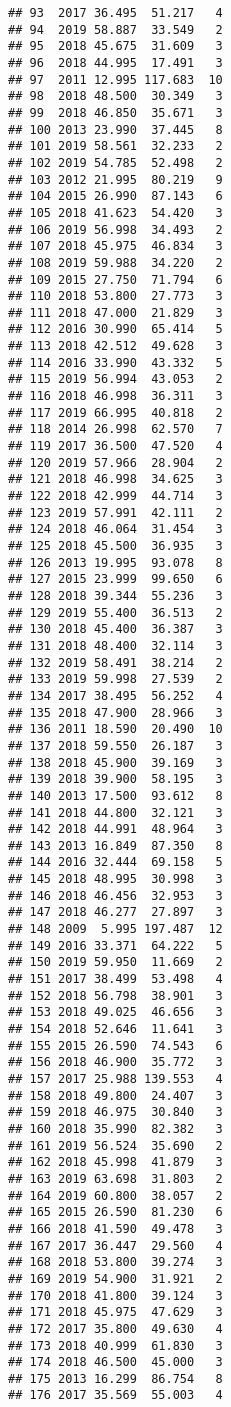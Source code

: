 \documentclass[
]{article}
\begin{document}
\begin{verbatim}
## 93  2017 36.495  51.217   4
## 94  2019 58.887  33.549   2
## 95  2018 45.675  31.609   3
## 96  2018 44.995  17.491   3
## 97  2011 12.995 117.683  10
## 98  2018 48.500  30.349   3
## 99  2018 46.850  35.671   3
## 100 2013 23.990  37.445   8
## 101 2019 58.561  32.233   2
## 102 2019 54.785  52.498   2
## 103 2012 21.995  80.219   9
## 104 2015 26.990  87.143   6
## 105 2018 41.623  54.420   3
## 106 2019 56.998  34.493   2
## 107 2018 45.975  46.834   3
## 108 2019 59.988  34.220   2
## 109 2015 27.750  71.794   6
## 110 2018 53.800  27.773   3
## 111 2018 47.000  21.829   3
## 112 2016 30.990  65.414   5
## 113 2018 42.512  49.628   3
## 114 2016 33.990  43.332   5
## 115 2019 56.994  43.053   2
## 116 2018 46.998  36.311   3
## 117 2019 66.995  40.818   2
## 118 2014 26.998  62.570   7
## 119 2017 36.500  47.520   4
## 120 2019 57.966  28.904   2
## 121 2018 46.998  34.625   3
## 122 2018 42.999  44.714   3
## 123 2019 57.991  42.111   2
## 124 2018 46.064  31.454   3
## 125 2018 45.500  36.935   3
## 126 2013 19.995  93.078   8
## 127 2015 23.999  99.650   6
## 128 2018 39.344  55.236   3
## 129 2019 55.400  36.513   2
## 130 2018 45.400  36.387   3
## 131 2018 48.400  32.114   3
## 132 2019 58.491  38.214   2
## 133 2019 59.998  27.539   2
## 134 2017 38.495  56.252   4
## 135 2018 47.900  28.966   3
## 136 2011 18.590  20.490  10
## 137 2018 59.550  26.187   3
## 138 2018 45.900  39.169   3
## 139 2018 39.900  58.195   3
## 140 2013 17.500  93.612   8
## 141 2018 44.800  32.121   3
## 142 2018 44.991  48.964   3
## 143 2013 16.849  87.350   8
## 144 2016 32.444  69.158   5
## 145 2018 48.995  30.998   3
## 146 2018 46.456  32.953   3
## 147 2018 46.277  27.897   3
## 148 2009  5.995 197.487  12
## 149 2016 33.371  64.222   5
## 150 2019 59.950  11.669   2
## 151 2017 38.499  53.498   4
## 152 2018 56.798  38.901   3
## 153 2018 49.025  46.656   3
## 154 2018 52.646  11.641   3
## 155 2015 26.590  74.543   6
## 156 2018 46.900  35.772   3
## 157 2017 25.988 139.553   4
## 158 2018 49.800  24.407   3
## 159 2018 46.975  30.840   3
## 160 2018 35.990  82.382   3
## 161 2019 56.524  35.690   2
## 162 2018 45.998  41.879   3
## 163 2019 63.698  31.803   2
## 164 2019 60.800  38.057   2
## 165 2015 26.590  81.230   6
## 166 2018 41.590  49.478   3
## 167 2017 36.447  29.560   4
## 168 2018 53.800  39.274   3
## 169 2019 54.900  31.921   2
## 170 2018 41.800  39.124   3
## 171 2018 45.975  47.629   3
## 172 2017 35.800  49.630   4
## 173 2018 40.999  61.830   3
## 174 2018 46.500  45.000   3
## 175 2013 16.299  86.754   8
## 176 2017 35.569  55.003   4

\end{verbatim}
\end{document}
